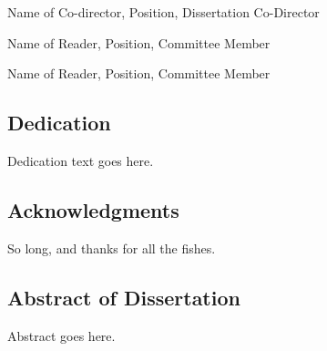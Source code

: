 \documentclass[12pt]{article}
\begin{document}
\indent Name of Co-director, Position, Dissertation Co-Director
\vspace{12pt}

\indent Name of Reader, Position, Committee Member
\vspace{12pt}

\indent Name of Reader, Position, Committee Member
\vspace{12pt}

\newpage
{} \label{dedication}
\begin{center}
\section*{\textbf{Dedication}}
\end{center}
\begin{center}
\vspace*{6pt}
Dedication text goes here.

\end{center}

\doublespacing
\newpage
{} \label{acknowledgements}
\begin{center}
\section*{Acknowledgments}
\end{center}
\vspace*{6pt}
So long, and thanks for all the fishes.
\doublespacing
\newpage
\begin{center}
\section*{Abstract of Dissertation}
\end{center}
 \label{abstract}
\vspace*{-40pt}
\vspace{24pt}
\begin{singlespace}
\end{singlespace}
\vspace{-12pt}
\vspace*{24pt}
Abstract goes here.
\doublespacing
\newpage
\tableofcontents
\newpage
\cleardoublepage
\end{document}
